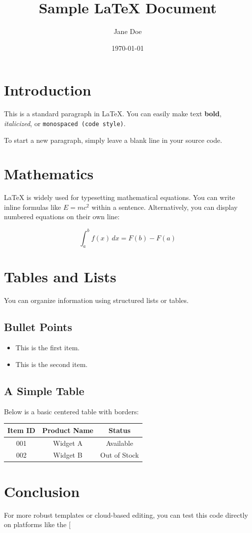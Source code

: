 \documentclass[12pt, letterpaper]{article}
\title{Sample LaTeX Document}
\author{Jane Doe}
\date{\today}
\begin{document}
\maketitle

\section{Introduction}
This is a standard paragraph in \LaTeX. You can easily make text \textbf{bold}, \textit{italicized}, or \texttt{monospaced (code style)}. 

To start a new paragraph, simply leave a blank line in your source code.

\section{Mathematics}
LaTeX is widely used for typesetting mathematical equations. You can write inline formulas like $E = mc^2$ within a sentence. Alternatively, you can display numbered equations on their own line:

\begin{equation}
    \int_{a}^{b} f(x) \,dx = F(b) - F(a)
\end{equation}

\section{Tables and Lists}
You can organize information using structured lists or tables.

\subsection{Bullet Points}
\begin{itemize}
    \item This is the first item.
    \item This is the second item.
\end{itemize}

\subsection{A Simple Table}
Below is a basic centered table with borders:

\begin{center}
\begin{tabular}{|c|c|c|}
    \hline
    Item ID & Product Name & Status \\
    \hline
    001 & Widget A & Available \\
    002 & Widget B & Out of Stock \\
    \hline
\end{tabular}
\end{center}

\section{Conclusion}
For more robust templates or cloud-based editing, you can test this code directly on platforms like the [
\end{document}
